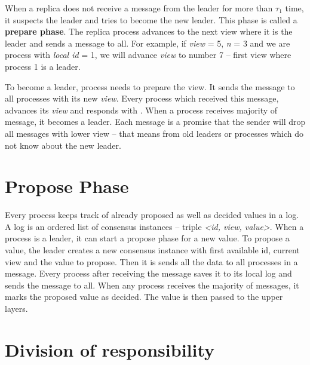 \begin{TODO} %
When a replica does not receive a message from the leader for more than $\tau_1$ time, it suspects the leader and tries to become the new leader. This phase is called a \textbf{prepare phase}. The replica process advances to the next view where it is the leader and sends a \prepare message to all. For example, if \textit{view} = 5, \textit{n} = 3 and we are process with \textit{local id} = 1, we will advance \textit{view} to number 7 -- first view where process 1 is a leader.

To become a leader, process needs to prepare the view. It sends the \prepare message to all processes with its new \textit{view}. Every process which received this message, advances its \textit{view} and responds with \prepareOK[]. When a process receives majority of \prepareOK message, it becomes a leader. Each \prepareOK message is a promise that the sender will drop all messages with lower view -- that means from old leaders or processes which do not know about the new leader.
\end{TODO}


\section{Propose Phase} %

Every process keeps track of already proposed as well as decided values in a log. A log is an ordered list of consensus instances -- triple \textit{<id, view, value>}. When a process is a leader, it can start a propose phase for a new value. To propose a value, the leader creates a new consensus instance with first available id, current view and the value to propose. Then it is sends all the data to all processes in a \propose message. Every process after receiving the \propose message saves it to its local log and sends the \accept message to all. When any process receives the majority of \accept messages, it marks the proposed value as decided. The value is then passed to the upper layers.


\section{Division of responsibility}

